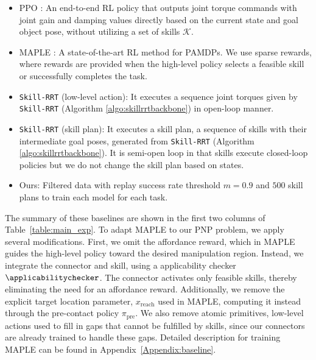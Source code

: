 \begin{itemize}

    \item PPO \cite{schulman2017proximal}: An end-to-end RL policy that outputs joint torque commands with joint gain and damping values directly based on the current state and goal object pose, without utilizing a set of skills $\mathcal{K}$. %

    \item MAPLE \cite{nasiriany2022augmenting}: A state-of-the-art RL method for PAMDPs. We use sparse rewards, where rewards are provided when the high-level policy selects a feasible skill or successfully completes the task.
        
    \item \texttt{Skill-RRT} (low-level action): It executes a sequence joint torques given by \texttt{Skill-RRT} (Algorithm \ref{algo:skillrrtbackbone}) in open-loop manner.
    
    \item \texttt{Skill-RRT} (skill plan): It executes a skill plan, a sequence of skills with their intermediate goal poses, generated from \texttt{Skill-RRT} (Algorithm \ref{algo:skillrrtbackbone}). It is semi-open loop in that skills execute closed-loop policies but we do not change the skill plan based on states.

    \item Ours: Filtered data with replay success rate threshold $m=0.9$ and $500$ skill plans to train each model for each task.
\end{itemize}
The summary of these baselines are shown in the first two columns of Table~\ref{table:main_exp}. To adapt MAPLE to our PNP problem, we apply several modifications. First, we omit the affordance reward, which in MAPLE guides the high-level policy toward the desired manipulation region. Instead, we integrate the connector and skill, using a applicability checker $\applicabilitychecker$. The connector activates only feasible skills, thereby eliminating the need for an affordance reward. Additionally, we remove the explicit target location parameter, $x_\text{reach}$ used in MAPLE, computing it instead through the pre-contact policy $\pi_\text{pre}$. We also remove atomic primitives, low-level actions used to fill in gaps that cannot be fulfilled by skills, since our connectors are already trained to handle these gaps. Detailed description for training MAPLE can be found in Appendix~\ref{Appendix:baseline}.

